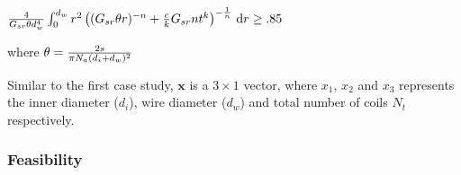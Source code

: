 \documentclass[10pt]{article}
\begin{document}
 \centerline{${4\over G_{sr}\theta d_w^4}\int_0^{d_w} r^2 \left( (G_{sr}\theta r)^{-n} + {c\over k} G_{sr}nt^k \right)^{-{1\over n}} \,\mathrm{d} r \ge .85$}
\centerline{where $\theta = {2s\over \pi N_a (d_i+d_w)^2}$}

\begin{flushleft}
Similar to the first case study, $\textbf{x}$ is a $3 \times 1$ vector, where $x_{1}$, $x_{2}$ and $x_{3}$ represents the inner diameter ($d_{i}$), wire diameter ($d_{w}$) and total number of coils $N_{t}$ respectively.
\end{flushleft}


\newpage
\subsubsection{Feasibility}
	
\end{document}

